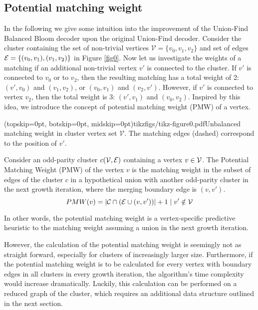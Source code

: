 \subsection{Potential matching weight}\label{sec:matchingweight}

In the following we give some intuition into the improvement of the Union-Find Balanced Bloom decoder upon the original Union-Find decoder. Consider the cluster containing the set of non-trivial vertices $\mathcal{V}=\{v_0,v_1,v_2\}$ and set of edges $\mathcal{E}=\{(v_0,v_1), (v_1, v_2)\}$ in Figure \ref{fig0}. Now let us investigate the weights of a matching if an additional non-trivial vertex $v'$ is connected to the cluster. If $v'$ is connected to $v_0$ or to $v_2$, then the resulting matching has a total weight of 2: $(v',v_0)$ and $(v_1,v_2)$, or $(v_0,v_1)$ and $(v_2,v')$. However, if $v'$ is connected to vertex $v_2$, then the total weight is 3: $(v', v_1)$ and $(v_0, v_2)$. Inspired by this idea, we introduce the concept of potential matching weight (PMW) of a vertex. 

\Figure[htb](topskip=0pt, botskip=0pt, midskip=0pt){tikzfigs/tikz-figure0.pdf}{Unbalanced matching weight in cluster vertex set $\mathcal{V}$. The matching edges (dashed) correspond to the position of $v'$.\label{fig0}}

\begin{definition}\label{def:pmw}
    Consider an odd-parity cluster $c(\mathcal{V},\mathcal{E})$ containing a vertex $v\in \mathcal{V}$. The Potential Matching Weight (PMW) of the vertex $v$ is the matching weight in the subset of edges of the cluster $c$ in a hypothetical union with another odd-parity cluster in the next growth iteration, where the merging boundary edge is $(v,v')$. 
    \begin{equation}
      PMW(v) = \lvert\mathcal{C} \cap (\mathcal{E} \cup (v, v'))\rvert + 1 \mid v' \notin \mathcal{V} 
    \end{equation}
\end{definition}
In other words, the potential matching weight is a vertex-specific predictive heuristic to the matching weight assuming a union in the next growth iteration. 

However, the calculation of the potential matching weight is seemingly not as straight forward, especially for clusters of increasingly larger size. Furthermore, if the potential matching weight is to be calculated for every vertex with boundary edges in all clusters in every growth iteration, the algorithm's time complexity would increase dramatically. Luckily, this calculation can be performed on a reduced graph of the cluster, which requires an additional data structure outlined in the next section. 

